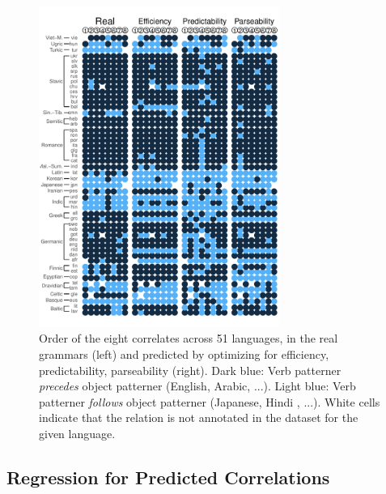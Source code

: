 \documentclass[10pt,twoside,lineno]{article}
\begin{document}
\begin{figure} 
	\begin{center}
	\includegraphics[width=0.7\textwidth]{../results/correlations/figures/pred-eff-pred-pars-families-2.pdf} %
	\end{center}
	\caption{Order of the eight correlates across 51 languages, in the real grammars (left) and predicted by optimizing for efficiency, predictability, parseability (right). Dark blue: Verb patterner \emph{precedes} object patterner (English, Arabic, ...). Light blue: Verb patterner \emph{follows} object patterner (Japanese, Hindi , ...). White cells indicate that the relation is not annotated in the dataset for the given language.}\label{fig:per-lang}
\end{figure}

\subsection{Regression for Predicted Correlations}
\end{document}
